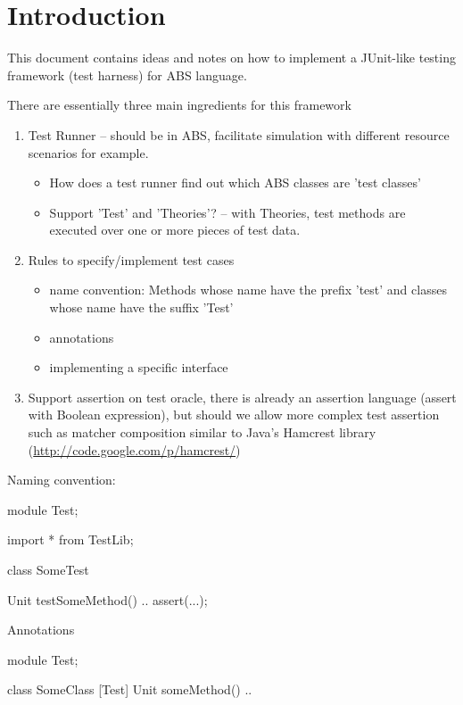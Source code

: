 \documentclass[a4paper,11pt,final]{article}
\title{\deliverableTitle}
\author{Peter Y. H. Wong}
\begin{document}
\maketitle 

\section{Introduction}
This document contains ideas and notes on how to implement a JUnit-like testing
framework (test harness) for ABS language.

There are essentially three main ingredients for this framework
\begin{enumerate}
  \item Test Runner -- should be in ABS, facilitate simulation with different
  resource scenarios for example.
  \begin{itemize}
    \item How does a test runner find out which ABS classes are 'test classes' 
    \item Support 'Test' and 'Theories'? -- with Theories, test methods are
    executed over one or more pieces of test data.
  \end{itemize}
  \item Rules to specify/implement test cases
  \begin{itemize}
    \item name convention: Methods whose name have the prefix 'test' and classes whose name have the suffix 'Test'
    \item annotations 
    \item implementing a specific interface
  \end{itemize}
  \item Support assertion on test oracle, there is already an assertion language
  (assert with Boolean expression), but should we allow more complex test
  assertion such as matcher composition similar to Java's Hamcrest library
  (\url{http://code.google.com/p/hamcrest/})
\end{enumerate}

\noindent Naming convention:
\begin{absexamplen}
module Test;

import * from TestLib;

class SomeTest {

  Unit testSomeMethod() {
  	 ..
  	 assert(...);
  }
}
\end{absexamplen}

\noindent Annotations
\begin{absexamplen}
module Test;

class SomeClass { 
  [Test] Unit someMethod() {
  	 ..
  }
}
\end{absexamplen}
\end{document}
